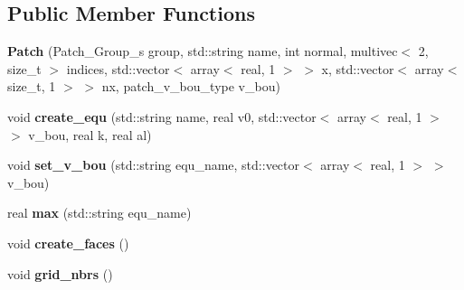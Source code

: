\subsection*{Public Member Functions}
\begin{DoxyCompactItemize}
\item 
\hypertarget{classPatch_a74d349d49bdf800d6f7d6c31c7f39eb3}{
{\bfseries Patch} (Patch\_\-Group\_\-s group, std::string name, int normal, multivec$<$ 2, size\_\-t $>$ indices, std::vector$<$ array$<$ real, 1 $>$ $>$ x, std::vector$<$ array$<$ size\_\-t, 1 $>$ $>$ nx, patch\_\-v\_\-bou\_\-type v\_\-bou)}
\label{classPatch_a74d349d49bdf800d6f7d6c31c7f39eb3}

\item 
\hypertarget{classPatch_ac8352cc930b37975da9627262540cebd}{
void {\bfseries create\_\-equ} (std::string name, real v0, std::vector$<$ array$<$ real, 1 $>$ $>$ v\_\-bou, real k, real al)}
\label{classPatch_ac8352cc930b37975da9627262540cebd}

\item 
\hypertarget{classPatch_af0311eccfd4f4fd356785f7b23dc8fa2}{
void {\bfseries set\_\-v\_\-bou} (std::string equ\_\-name, std::vector$<$ array$<$ real, 1 $>$ $>$ v\_\-bou)}
\label{classPatch_af0311eccfd4f4fd356785f7b23dc8fa2}

\item 
\hypertarget{classPatch_aa0a6036ed90bf4a98cc498f925fb530d}{
real {\bfseries max} (std::string equ\_\-name)}
\label{classPatch_aa0a6036ed90bf4a98cc498f925fb530d}

\item 
\hypertarget{classPatch_a2af23d9c0ebbb60d35c24bb3fb582b64}{
void {\bfseries create\_\-faces} ()}
\label{classPatch_a2af23d9c0ebbb60d35c24bb3fb582b64}

\item 
\hypertarget{classPatch_ae57b4223cce6c1ed9dbaaa5080a2501a}{
void {\bfseries grid\_\-nbrs} ()}
\label{classPatch_ae57b4223cce6c1ed9dbaaa5080a2501a}

\end{DoxyCompactItemize}
